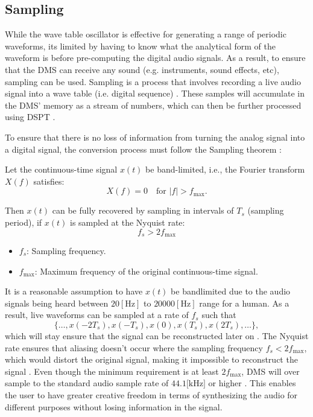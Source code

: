 \documentclass[12pt]{article}
\begin{document}
\subsection{Sampling}
While the wave table oscillator is effective for generating a range of periodic waveforms, its limited by having to know what the analytical form of the waveform is before pre-computing the digital audio signals. As a result, to ensure that the DMS can receive any sound (e.g. instruments, sound effects, etc), sampling can be used. Sampling is a process that involves recording a live audio signal into a wave table (i.e. digital sequence) \cite{TTEM}. These samples will accumulate in the DMS' memory as a stream of numbers, which can then be further processed using DSPT \cite{SS}.
\vspace{1em}

To ensure that there is no loss of information from turning the analog signal into a digital signal, the conversion process must follow the Sampling theorem \cite{Sampling_Theorem, FC}:
\vspace{1em}

Let the continuous-time signal \( x(t) \) be band-limited, i.e., the Fourier transform \( X(f) \) satisfies:
\begin{equation}
    X(f) = 0 \quad \text{for } |f| > f_{\text{max}}.
\end{equation}

Then $x(t)$ can be fully recovered by sampling in intervals of $T_s$ (sampling period), if $x(t)$ is sampled at the Nyquist rate:
\begin{equation}
    f_s > 2 f_{\text{max}}
\end{equation}

\begin{itemize}
    \item \( f_s \): Sampling frequency.
    \item \( f_{\text{max}} \): Maximum frequency of the original continuous-time signal.
\end{itemize}

It is a reasonable assumption to have $x(t)$ be bandlimited due to the audio signals being heard between $20 [\text{Hz}]$ to $20000 [\text{Hz}]$ range for a human. As a result, live waveforms can be sampled at a rate of $f_s$ such that 
$$\{\ldots,x(-2T_s),x(-T_s),x(0),x(T_s),x(2T_s),\ldots\},$$
which will stay ensure that the signal can be reconstructed later on \cite{FC}. The Nyquist rate ensures that aliasing doesn't occur where the sampling frequency \( f_s < 2 f_{\max} \), which would distort the original signal, making it impossible to reconstruct the signal \cite{Sampling_Theorem}. Even though the minimum requirement is at least $2f_{\max}$, DMS will over sample to the standard audio sample rate of $44.1 \text{[kHz]}$ or higher \cite{AB}. This enables the user to have greater creative freedom in terms of synthesizing the audio for different purposes without losing information in the signal. 
\vspace{1em}
\end{document}
